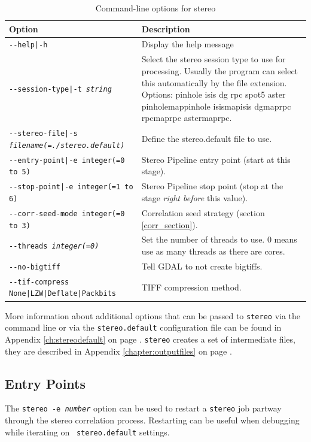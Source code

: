 \begin{longtable}{|l|p{7.5cm}|}
\caption{Command-line options for stereo}
\label{tbl:stereo}
\endfirsthead
\endhead
\endfoot
\endlastfoot
\hline
Option & Description \\ \hline \hline
\texttt{-\/-help|-h} & Display the help message\\ \hline
\texttt{-\/-session-type|-t \textit{string} } & Select the stereo session type to use for processing. Usually the program can select this automatically by the file extension. Options: pinhole isis dg rpc spot5 aster pinholemappinhole isismapisis dgmaprpc rpcmaprpc astermaprpc. \\ \hline
\texttt{-\/-stereo-file|-s \textit{filename(=./stereo.default)}} & Define the stereo.default file to use.\\ \hline
\texttt{-\/-entry-point|-e integer(=0 to 5)} & Stereo Pipeline entry
point (start at this stage). \\ \hline
\texttt{-\/-stop-point|-e integer(=1 to 6)} & Stereo Pipeline stop point (stop at the stage {\it right before} this value). \\ \hline
\texttt{-\/-corr-seed-mode integer(=0 to 3)} & Correlation seed strategy (section \ref{corr_section}). \\ \hline
\texttt{-\/-threads \textit{integer(=0)}} & Set the number of threads to use. 0 means use as many threads as there are cores.\\ \hline
\texttt{-\/-no-bigtiff} & Tell GDAL to not create bigtiffs.\\ \hline
\texttt{-\/-tif-compress None|LZW|Deflate|Packbits} & TIFF compression method.\\ \hline
\end{longtable}

More information about additional options that can be passed to \texttt{stereo}
via the command line or via the \texttt{stereo.default} configuration file can be
found in Appendix \ref{ch:stereodefault} on page
\pageref{ch:stereodefault}.  \texttt{stereo} creates a set
of intermediate files, they are described in Appendix
\ref{chapter:outputfiles} on page \pageref{chapter:outputfiles}.

\subsection{Entry Points}
\label{entrypoints}

The \texttt{stereo -e \textit{number}} option can be used to restart
a {\tt stereo} job partway through the stereo correlation process.
Restarting can be useful when debugging while iterating on {\tt
stereo.default} settings.

